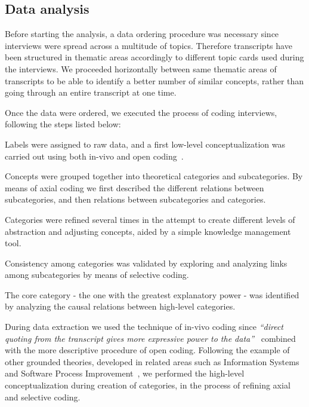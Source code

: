 \documentclass[10pt,journal,letterpaper,compsoc]{IEEEtran}
\begin{document}
\subsection{Data analysis} Before starting the analysis, a data ordering
procedure was necessary since interviews were spread across a multitude of
topics. Therefore transcripts have been structured in thematic areas
accordingly to different topic cards used during the interviews. We proceeded
horizontally between same thematic areas of transcripts to be able to identify
a better number of similar concepts, rather than going through an entire
transcript at one time.

Once the data were ordered, we executed the process of coding interviews,
following the steps listed below:


\begin{compactitem}

\item Labels were assigned to raw data, and a first low-level conceptualization
was carried out using both in-vivo and open coding~\cite{ColinRobson2009}. 
\item Concepts were grouped together into theoretical categories and 
subcategories. By means of axial coding we first described the different 
relations between subcategories, and then relations between subcategories and 
categories. 
\item Categories were refined several times in the attempt to create different 
levels of abstraction and adjusting concepts, aided by a simple knowledge 
management tool. 
\item Consistency among categories was validated by exploring and
analyzing links among subcategories by means of selective coding. 
\item The core category - the one with the greatest explanatory power - was 
identified by analyzing the causal relations between high-level categories. 
\end{compactitem}


During data extraction we used the technique of in-vivo coding since
\textit{``direct quoting from the transcript gives more expressive power to the
data''}~\cite{ColinRobson2009} combined with the more descriptive procedure of
open coding. Following the example of other grounded theories, developed in
related areas such as Information Systems~\cite{Orlikowski1993} and Software
Process Improvement~\cite{Coleman2006}, we performed the high-level
conceptualization during creation of categories, in the process of refining
axial and selective coding.
\end{document}
